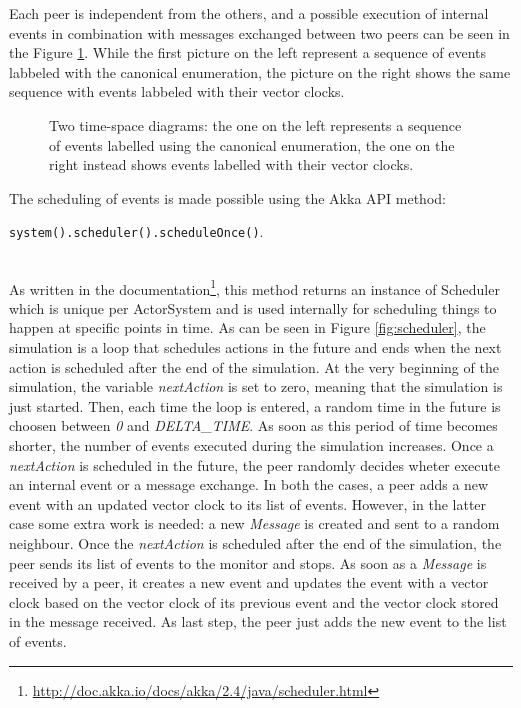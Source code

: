 \documentclass[11pt]{article}
\newcommand{\code}[1]{\colorbox{codegray}{\texttt{#1}}}
\begin{document}


\noindent
Each peer is independent from the others, and a possible execution of internal events in combination with messages exchanged between two peers can be seen in the Figure \ref{fig:time_space_diagrams}. While the first picture on the left represent a sequence of events labbeled with the canonical enumeration, the picture on the right shows the same sequence with events labbeled with their vector clocks.

\begin{figure}[ht]
	\centering
	\begin{minipage}{.5\textwidth}
	  \scalebox{.8}{}
	\end{minipage}%
	\begin{minipage}{.5\textwidth}
	  \scalebox{.8}{}
	\end{minipage}
	\caption{Two time-space diagrams: the one on the left represents a sequence of events labelled using the canonical enumeration, the one on the right instead shows events labelled with their vector clocks.}
	\label{fig:time_space_diagrams}
\end{figure}

\noindent
The scheduling of events is made possible using the Akka API method: \\ \vspace{0.2cm}
\centerline{\code{system().scheduler().scheduleOnce()}.}\\
\noindent
As written in the documentation\footnote{\url{http://doc.akka.io/docs/akka/2.4/java/scheduler.html}}, this method returns an instance of Scheduler which is unique per ActorSystem and is used internally for scheduling things to happen at specific points in time. As can be seen in Figure \ref{fig:scheduler}, the simulation is a loop that schedules actions in the future and ends when the next action is scheduled after the end of the simulation. At the very beginning of the simulation, the variable \textit{nextAction} is set to zero, meaning that the simulation is just started. Then, each time the loop is entered, a random time in the future is choosen between \textit{0} and \textit{DELTA\_TIME}. As soon as this period of time becomes shorter, the number of events executed during the simulation increases. Once a \textit{nextAction} is scheduled in the future, the peer randomly decides wheter execute an internal event or a message exchange. In both the cases, a peer adds a new event with an updated vector clock to its list of events. However, in the latter case some extra work is needed: a new \textit{Message} is created and sent to a random neighbour. Once the \textit{nextAction} is scheduled after the end of the simulation, the peer sends its list of events to the monitor and stops. As soon as a \textit{Message} is received by a peer, it creates a new event and updates the event with a vector clock based on the vector clock of its previous event and the vector clock stored in the message received. As last step, the peer just adds the new event to the list of events.
\end{document}
